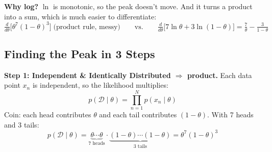 \textbf{Why log?} $\ln$ is monotonic, so the peak doesn't move. And it turns a product into a sum, which is much easier to differentiate:
\[
\tfrac{d}{d\theta}\big[\theta^7(1-\theta)^3\big] \;\text{(product rule, messy)}
\qquad \text{vs.} \qquad
\tfrac{d}{d\theta}\big[7\ln \theta + 3\ln(1-\theta)\big] = \tfrac{7}{\theta} - \tfrac{3}{1-\theta}
\]

\subsection*{Finding the Peak in 3 Steps}
\begin{keeptogether}
\textbf{Step 1: Independent \& Identically Distributed $\Rightarrow$ product.} Each data point $x_n$ is independent, so the likelihood multiplies:
\[
p(\mathcal{D} \mid \theta) = \prod_{n=1}^{N} p(x_n \mid \theta)
\]
Coin: each head contributes $\theta$ and each tail contributes $(1-\theta)$. With 7 heads and 3 tails:
\[
p(\mathcal{D} \mid \theta) = \underbrace{\theta \cdots \theta}_{7 \text{ heads}} \cdot \underbrace{(1-\theta) \cdots (1-\theta)}_{3 \text{ tails}} = \theta^{7}(1-\theta)^{3}
\]
\end{keeptogether}

